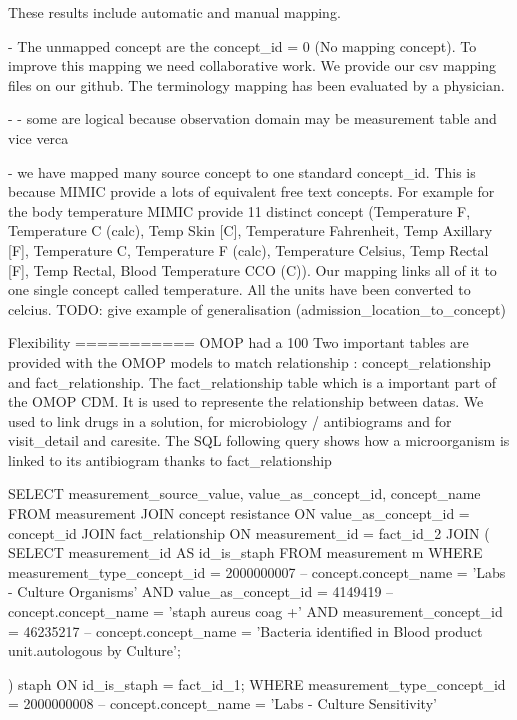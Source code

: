 These results include automatic and manual mapping.

- The unmapped concept are the concept_id = 0 (No mapping concept). To improve this mapping we need collaborative work. We provide our csv mapping files on our github.
The terminology mapping has been evaluated by a physician. 

- %
	- some are logical because observation domain may be measurement table and vice verca

- we have mapped  many source concept to one standard concept_id. This is because MIMIC provide a lots of equivalent free text concepts.
  For example for the body temperature MIMIC provide 11 distinct concept (Temperature F, Temperature C (calc), Temp Skin [C], Temperature Fahrenheit, Temp Axillary [F], Temperature C, Temperature F (calc), Temperature Celsius, Temp Rectal [F], Temp Rectal, Blood Temperature CCO (C)). Our mapping links all of it to one single concept called temperature. All the units have been converted to celcius.
  TODO: give example of generalisation (admission_location_to_concept)

Flexibility  
===========
OMOP had a 100%
Two important tables are provided with the OMOP models to  match relationship : concept_relationship and fact_relationship.
The fact_relationship table which is a important part of the OMOP CDM. It is used to represente the relationship between datas.
We used to link drugs in a solution, for  microbiology / antibiograms and for visit_detail and caresite.
The SQL following query shows how a microorganism is linked to its antibiogram thanks to fact_relationship

SELECT measurement_source_value, value_as_concept_id, concept_name
FROM measurement
JOIN concept resistance ON value_as_concept_id = concept_id
JOIN fact_relationship ON measurement_id =  fact_id_2
JOIN
(
	SELECT measurement_id AS id_is_staph
	FROM measurement m
	WHERE measurement_type_concept_id = 2000000007        			-- concept.concept_name = 'Labs - Culture Organisms'
	AND value_as_concept_id = 4149419                     			-- concept.concept_name = 'staph aureus coag +'
	AND measurement_concept_id = 46235217               			-- concept.concept_name = 'Bacteria identified in Blood product unit.autologous by Culture';

) staph ON id_is_staph = fact_id_1;
WHERE measurement_type_concept_id = 2000000008        			        -- concept.concept_name = 'Labs - Culture Sensitivity'



